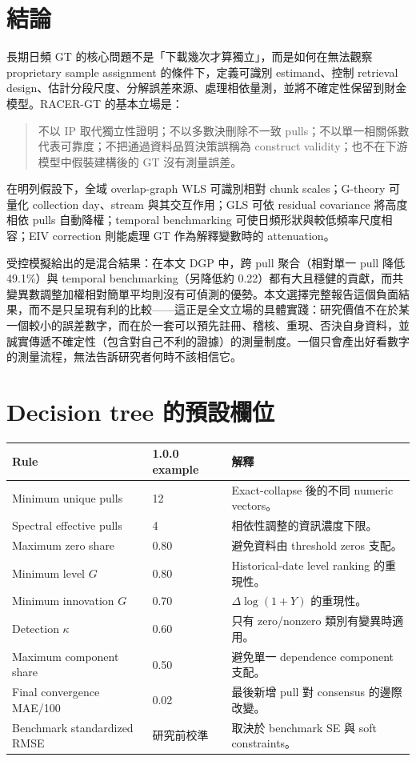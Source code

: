 \documentclass[12pt,a4paper,oneside]{article}
\begin{document}
\section{結論}

長期日頻 GT 的核心問題不是「下載幾次才算獨立」，而是如何在無法觀察 proprietary sample assignment 的條件下，定義可識別 estimand、控制 retrieval design、估計分段尺度、分解誤差來源、處理相依量測，並將不確定性保留到財金模型。RACER-GT 的基本立場是：

\begin{quote}
不以 IP 取代獨立性證明；不以多數決刪除不一致 pulls；不以單一相關係數代表可靠度；不把通過資料品質決策誤稱為 construct validity；也不在下游模型中假裝建構後的 GT 沒有測量誤差。
\end{quote}

在明列假設下，全域 overlap-graph WLS 可識別相對 chunk scales；G-theory 可量化 collection day、stream 與其交互作用；GLS 可依 residual covariance 將高度相依 pulls 自動降權；temporal benchmarking 可使日頻形狀與較低頻率尺度相容；EIV correction 則能處理 GT 作為解釋變數時的 attenuation。

受控模擬給出的是混合結果：在本文 DGP 中，跨 pull 聚合（相對單一 pull 降低 49.1\%）與 temporal benchmarking（另降低約 0.22）都有大且穩健的貢獻，而共變異數調整加權相對簡單平均則沒有可偵測的優勢。本文選擇完整報告這個負面結果，而不是只呈現有利的比較——這正是全文立場的具體實踐：研究價值不在於某一個較小的誤差數字，而在於一套可以預先註冊、稽核、重現、否決自身資料，並誠實傳遞不確定性（包含對自己不利的證據）的測量制度。一個只會產出好看數字的測量流程，無法告訴研究者何時不該相信它。

\appendix

\section{Decision tree 的預設欄位}

\begin{longtable}{p{4.7cm}p{3.2cm}p{6.0cm}}
\toprule
Rule & 1.0.0 example & 解釋\\
\midrule
Minimum unique pulls & 12 & Exact-collapse 後的不同 numeric vectors。\\
Spectral effective pulls & 4 & 相依性調整的資訊濃度下限。\\
Maximum zero share & 0.80 & 避免資料由 threshold zeros 支配。\\
Minimum level $G$ & 0.80 & Historical-date level ranking 的重現性。\\
Minimum innovation $G$ & 0.70 & $\Delta\log(1+Y)$ 的重現性。\\
Detection $\kappa$ & 0.60 & 只有 zero/nonzero 類別有變異時適用。\\
Maximum component share & 0.50 & 避免單一 dependence component 支配。\\
Final convergence MAE/100 & 0.02 & 最後新增 pull 對 consensus 的邊際改變。\\
Benchmark standardized RMSE & 研究前校準 & 取決於 benchmark SE 與 soft constraints。\\
\bottomrule
\end{longtable}
\end{document}
